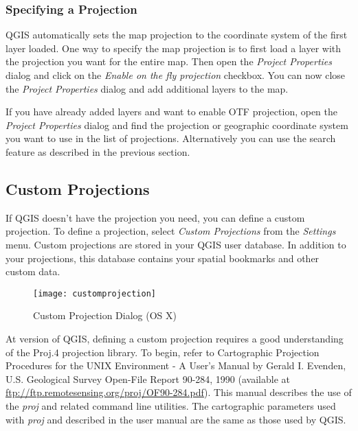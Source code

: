 \subsubsection{Specifying a Projection}
\label{sec:projection-specifying}

QGIS automatically sets the map projection to the coordinate system of the
first layer loaded. One way to specify the map projection is to first load a
layer with the projection you want for the entire map. Then open the
\textit{Project Properties} dialog and click on the \textit{Enable on the fly
projection} checkbox. You can now close the \textit{Project Properties} dialog
and add additional layers to the map. 

If you have already added layers and want to enable OTF projection, open the 
\textit{Project Properties} dialog and find the projection or geographic
coordinate system you want to use in the list of projections. Alternatively
you can use the search feature as described in the previous section.

\subsection{Custom Projections}\label{sec:customprojections}

If QGIS doesn't have the projection you need, you can define a custom
projection. To define a projection, select \textit{Custom Projections} from
the \textit{Settings} menu. Custom projections are stored in your QGIS user
database. In addition to your projections, this database contains your spatial
bookmarks and other custom data. 

\begin{figure}[ht]
   \begin{center}
   \caption{Custom Projection Dialog (OS
X)}\label{fig:customprojections}\smallskip
   \texttt{[image: customprojection]}
\end{center}  
\end{figure}

At version \CURRENT of QGIS, defining a custom projection requires a good
understanding of the Proj.4 projection library. To begin, refer to
Cartographic Projection Procedures for the UNIX Environment - A User's Manual
by Gerald I. Evenden, U.S. Geological Survey Open-File Report 90-284, 1990
(available at \url{ftp://ftp.remotesensing.org/proj/OF90-284.pdf}).
This manual describes the use of the \textit{proj} and related command line
utilities. The cartographic parameters used with \textit{proj} and described
in the user manual are the same as those used by QGIS. 

